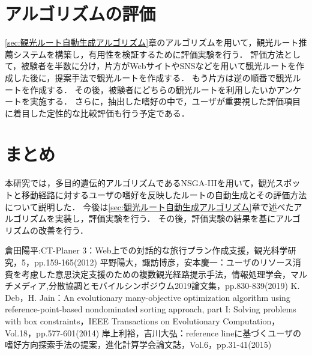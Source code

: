 \section{アルゴリズムの評価}\label{sec:アルゴリズムの評価}
\ref{sec:観光ルート自動生成アルゴリズム}章のアルゴリズムを用いて，観光ルート推薦システムを構築し，有用性を検証するために評価実験を行う．
評価方法として，被験者を半数に分け，片方がWebサイトやSNSなどを用いて観光ルートを作成した後に，提案手法で観光ルートを作成する．
もう片方は逆の順番で観光ルートを作成する．
その後，被験者にどちらの観光ルートを利用したいかアンケートを実施する．
さらに，抽出した嗜好の中で，ユーザが重要視した評価項目に着目した定性的な比較評価も行う予定である．

\section{まとめ}\label{sec:まとめ}
本研究では，多目的遺伝的アルゴリズムであるNSGA-I\hspace{-.1em}I\hspace{-.1em}Iを用いて，観光スポットと移動経路に対するユーザの嗜好を反映したルートの自動生成とその評価方法について説明した．
今後は\ref{sec:観光ルート自動生成アルゴリズム}章で述べたアルゴリズムを実装し，評価実験を行う．
その後，評価実験の結果を基にアルゴリズムの改善を行う．

\begin{thebibliography}{99}
 倉田陽平:CT-Planer 3：Web上での対話的な旅行プラン作成支援，観光科学研究，5，pp.159-165(2012)
 平野陽大，諏訪博彦，安本慶一：ユーザのリソース消費を考慮した意思決定支援のための複数観光経路提示手法，情報処理学会，マルチメディア,分散協調とモバイルシンポジウム2019論文集，pp.830-839(2019)
 K. Deb，H. Jain：An evolutionary many-objective optimization algorithm using reference-point-based nondominated sorting approach, part I: Solving problems with box constraints，IEEE Transactions on Evolutionary Computation，Vol.18，pp.577-601(2014)
 岸上利裕，吉川大弘：reference lineに基づくユーザの嗜好方向探索手法の提案，進化計算学会論文誌，Vol.6，pp.31-41(2015)
\end{thebibliography}

%
%

